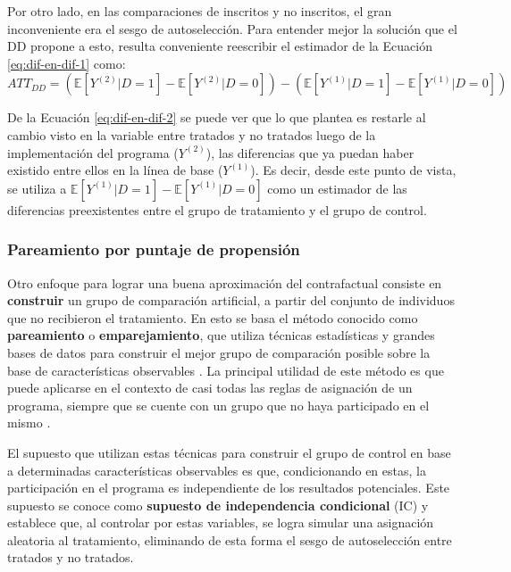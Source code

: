 \documentclass[../../main.tex]{subfiles}
\begin{document}
Por otro lado, en las comparaciones de inscritos y no inscritos, el gran inconveniente era
el sesgo de autoselección. Para entender mejor la solución que el DD propone a esto,
resulta conveniente reescribir el estimador de la Ecuación \ref{eq:dif-en-dif-1} como:
\begin{equation}
    ATT_{DD} =
        \left(
            \mathbb{E}\left[Y^{(2)}|D=1\right] - \mathbb{E}\left[Y^{(2)}|D=0\right]
        \right) -
        \left(
            \mathbb{E}\left[Y^{(1)}|D=1\right] - \mathbb{E}\left[Y^{(1)}|D=0\right]
        \right)
        \label{eq:dif-en-dif-2}
\end{equation}

De la Ecuación \ref{eq:dif-en-dif-2} se puede ver que lo que plantea es restarle al cambio
visto en la variable entre tratados y no tratados luego de la implementación del programa
(\(Y^{(2)}\)), las diferencias que ya puedan haber existido entre ellos en la línea de base
(\(Y^{(1)}\)). Es decir, desde este punto de vista, se utiliza a
\(\mathbb{E}\left[Y^{(1)}|D=1\right] - \mathbb{E}\left[Y^{(1)}|D=0\right]\) como un
estimador de las diferencias preexistentes entre el grupo de tratamiento y el grupo de
control.

\subsubsection{Pareamiento por puntaje de propensión}
Otro enfoque para lograr una buena aproximación del contrafactual consiste en
\textbf{construir} un grupo de comparación artificial, a partir del conjunto de individuos
que no recibieron el tratamiento. En esto se basa el método conocido como
\textbf{pareamiento} o \textbf{emparejamiento}, que utiliza técnicas estadísticas y
grandes bases de datos para construir el mejor grupo de comparación posible sobre la base
de características observables \cite{gertler-2016}. La principal utilidad de este método
es que puede aplicarse en el contexto de casi todas las reglas de asignación de un
programa, siempre que se cuente con un grupo que no haya participado en el mismo
\cite{gertler-2016}.

El supuesto que utilizan estas técnicas para construir el grupo de control en base a
determinadas características observables es que, condicionando en estas, la participación
en el programa es independiente de los resultados potenciales. Este supuesto se conoce
como \textbf{supuesto de independencia condicional} (IC) y establece que, al controlar por
estas variables, se logra simular una asignación aleatoria al tratamiento, eliminando
de esta forma el sesgo de autoselección entre tratados y no tratados.
\end{document}

